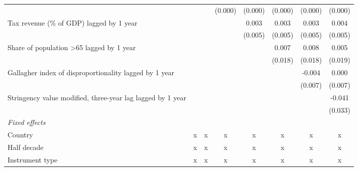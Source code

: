 \begin{tabular}{lccccccc}
                                                                                       &         &              & (0.000)       & (0.000)       & (0.000)       & (0.000)       & (0.000)\\   
   Tax revenue (\% of GDP) lagged by 1 year                                            &         &              &               & 0.003         & 0.003         & 0.003         & 0.004\\   
                                                                                       &         &              &               & (0.005)       & (0.005)       & (0.005)       & (0.005)\\   
   Share of population >65 lagged by 1 year                                            &         &              &               &               & 0.007         & 0.008         & 0.005\\   
                                                                                       &         &              &               &               & (0.018)       & (0.018)       & (0.019)\\   
   Gallagher index of disproportionality lagged by 1 year                              &         &              &               &               &               & -0.004        & 0.000\\   
                                                                                       &         &              &               &               &               & (0.007)       & (0.007)\\   
   Stringency value modified, three-year lag lagged by 1 year                          &         &              &               &               &               &               & -0.041\\   
                                                                                       &         &              &               &               &               &               & (0.033)\\   
   \emph{Fixed effects}\\
   Country                                                                             & x       & x            & x             & x             & x             & x             & x\\  
   Half decade                                                                         & x       & x            & x             & x             & x             & x             & x\\  
   Instrument type                                                                     & x       & x            & x             & x             & x             & x             & x\\  

\end{tabular}
